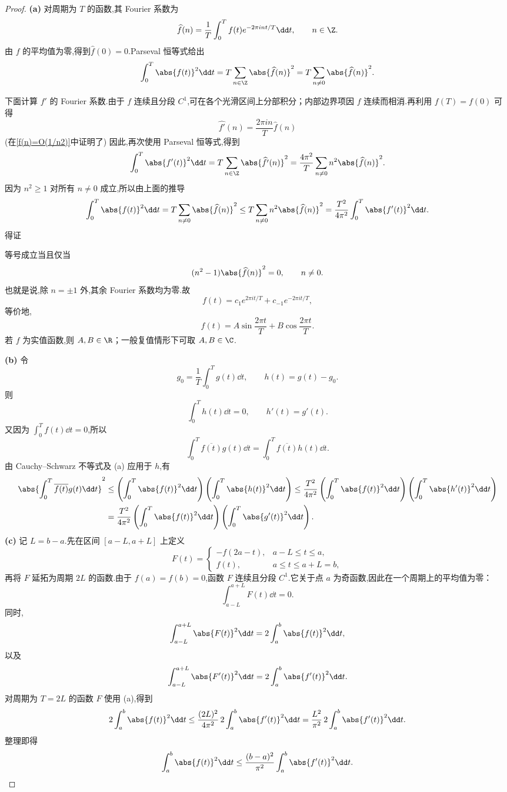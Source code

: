 \begin{proof}
	\textbf{(a)} 对周期为 $T$ 的函数,其 Fourier 系数为
	\[
		\widehat f(n)
		=
		\frac1T\int_0^T f(t)e^{-2\pi int/T}\dd t,
		\qquad n\in\Z.
	\]
	由 $f$ 的平均值为零,得到$\widehat f(0)=0.$Parseval 恒等式给出
\[ \int_0^T\abs{f(t)}^2\dd t
		=
		T\sum_{n\in\Z}\abs{\widehat f(n)}^2
		=
		T\sum_{n\neq0}\abs{\widehat f(n)}^2. \]


	下面计算 $f'$ 的 Fourier 系数.由于 $f$ 连续且分段 $C^1$,可在各个光滑区间上分部积分；内部边界项因 $f$ 连续而相消.再利用 $f(T)=f(0)$ 可得
	\[\widehat{f'}(n)
		=\frac{2\pi in}{T}\widehat f(n)\]
	(在\ref{f(n)=O(1/n2)}中证明了)	因此,再次使用 Parseval 恒等式,得到
\[\int_0^T\abs{f'(t)}^2\dd t
		=
		T\sum_{n\in\Z}\abs{\widehat{f'}(n)}^2=
		\frac{4\pi^2}{T}
		\sum_{n\neq0}n^2\abs{\widehat f(n)}^2.\]
	因为 $n^2\geq1$ 对所有 $n\neq0$ 成立,所以由上面的推导
	\[\int_0^T\abs{f(t)}^2\dd t
		=T\sum_{n\neq0}\abs{\widehat f(n)}^2\leq T\sum_{n\neq0}n^2\abs{\widehat f(n)}^2=\frac{T^2}{4\pi^2}
		\int_0^T\abs{f'(t)}^2\dd t.\]
	得证

	等号成立当且仅当
	\[
		(n^2-1)\abs{\widehat f(n)}^2=0,
		\qquad n\neq0.
	\]
	也就是说,除 $n=\pm1$ 外,其余 Fourier 系数均为零.故
	\[
		f(t)=c_1e^{2\pi it/T}+c_{-1}e^{-2\pi it/T},
	\]
	等价地,
	\[
		f(t)=A\sin\frac{2\pi t}{T}
		+B\cos\frac{2\pi t}{T}.
	\]
	若 $f$ 为实值函数,则 $A,B\in\R$；一般复值情形下可取
	$A,B\in\C$.
	
	\textbf{(b)} 令
	\[
		g_0=\frac1T\int_0^T g(t)\dd t,
		\qquad
		h(t)=g(t)-g_0.
	\]
	则
	\[
		\int_0^T h(t)\dd t=0,
		\qquad h'(t)=g'(t).
	\]
	又因为 $\displaystyle\int_0^T f(t)\dd t=0$,所以
	\[
		\int_0^T \overline{f(t)}g(t)\dd t
		=
		\int_0^T \overline{f(t)}h(t)\dd t.
	\]
	由 Cauchy--Schwarz 不等式及 (a) 应用于 $h$,有
	\[
	\begin{aligned}
		\abs{\int_0^T\overline{f(t)}g(t)\dd t}^2
		&\leq
		\left(\int_0^T\abs{f(t)}^2\dd t\right)
		\left(\int_0^T\abs{h(t)}^2\dd t\right)\leq
		\frac{T^2}{4\pi^2}
		\left(\int_0^T\abs{f(t)}^2\dd t\right)
		\left(\int_0^T\abs{h'(t)}^2\dd t\right)\\
		&=
		\frac{T^2}{4\pi^2}
		\left(\int_0^T\abs{f(t)}^2\dd t\right)
		\left(\int_0^T\abs{g'(t)}^2\dd t\right).
	\end{aligned}
	\]
	\textbf{(c)} 记 $L=b-a$.先在区间 $[a-L,a+L]$ 上定义
	\[
		F(t)=
		\begin{cases}
			-f(2a-t),&a-L\leq t\leq a,\\
			f(t),&a\leq t\leq a+L=b,
		\end{cases}
	\]
	再将 $F$ 延拓为周期 $2L$ 的函数.由于 $f(a)=f(b)=0$,函数
	$F$ 连续且分段 $C^1$.它关于点 $a$ 为奇函数,因此在一个周期上的平均值为零：
	\[
		\int_{a-L}^{a+L}F(t)\dd t=0.
	\]
	同时,
	\[
		\int_{a-L}^{a+L}\abs{F(t)}^2\dd t
		=2\int_a^b\abs{f(t)}^2\dd t,
	\]
	以及
	\[
		\int_{a-L}^{a+L}\abs{F'(t)}^2\dd t
		=2\int_a^b\abs{f'(t)}^2\dd t.
	\]
	对周期为 $T=2L$ 的函数 $F$ 使用 (a),得到
	\[2\int_a^b\abs{f(t)}^2\dd t
		\leq
		\frac{(2L)^2}{4\pi^2}
		\,2\int_a^b\abs{f'(t)}^2\dd t=
		\frac{L^2}{\pi^2}
		\,2\int_a^b\abs{f'(t)}^2\dd t.	\]
	整理即得
	\[
		\int_a^b\abs{f(t)}^2\dd t
		\leq
		\frac{(b-a)^2}{\pi^2}
		\int_a^b\abs{f'(t)}^2\dd t.
	\]


\end{proof}
